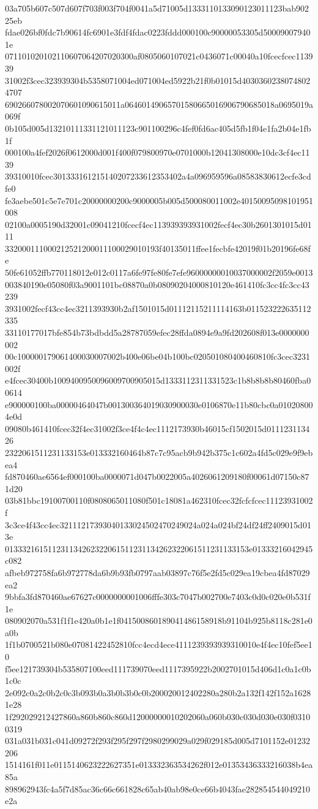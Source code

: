 03a705b607c507d607f703f003f704f0041a5d71005d1333110133090123011123bab90225eb
fdae026bf0fdc7b90614fc6901e3fdf4fdac0223fddd000100c90000053305d500090079401e
071101020102110607064207020300af0805060107021c0436071c00040a10fcecfcec113939
31002f3cec323939304b5358071004ed071004ed5922b21f0b01015d40303602380748024707
690266078002070601090615011a06460149065701580665016906790685018a0695019a069f
0b105d005d13210111331121011123c901100296c4fef0fd6ac405d5fb1f04e1fa2b04e1fb1f
000100a4fef2026f0612000d001f400f079800970e0701000b12041308000e10dc3cf4ec1139
39310010fcec301333161215140207233612353402a4a096959596a08583830612ecfe3cdfe0
fe3aebe501c5e7e701c20000000200c9000005b005d500080011002e40150095098101951008
02100a0005190d32001c09041210fcecf4ec113939393931002fecf4ec30b2601301015d0111
332000111000212521200011100029010193f40135011ffee1fecbfe42019f01b20196fe68fe
50fe61052ffb770118012e012c0117a6fe97fe80fe7efe96000000010037000002f2059e0013
003840190e05080f03a9001101bc08870a0b08090204000810120e461410fc3cc4fc3cc43239
3931002fecf43cc4ec3211393930b2af1501015d01112115211114163b011523222635112335
33110177017bfe854b73bdbdd5a28787059efec28ffda0894e9a9fd202608f013e0000000002
00c100000179061400030007002b400e06be04b100bc020501080400460810fc3cec3231002f
e4fcec30400b1009400950096009700905015d1333112311331523c1b8b8b8b80460fba00614
e900000100ba00000464047b001300364019030900030e0106870e11b80cbc0a010208004e0d
09080b461410fcec32f4ec31002f3ce4f4c4ec1112173930b46015cf1502015d011123113426
2322061511231133153e013332160464b87c7c95acb9b942b375c1c602a4fd5c029e9f9ebea4
fd870460ae6564ef000100ba0000071d047b0022005a4026061209180f00061d07150c871d20
03b81bbc19100700110f0808065011080f501c18081a462310fcec32fcfcfcec11123931002f
3c3ce4f43cc4ec32111217393040133024502470249024a024a024bf24df24ff2409015d013e
013332161511231134262322061511231134262322061511231133153e01333216042945c082
afbeb972758fa6b972778da6b9b93fb0797aab03897c76f5e2fd5c029ea19cbea4fd87029ea2
9bbfa3fd870460ae67627c0000000001006fffe303c7047b002700e7403c0d0c020e0b531f1e
080902070a531f1f1e420a0b1e1f041500860189041486158918b91104b925b8118c281e0a0b
1f1b0700521b080e07081422452810fcc4ecd4ece4111239393939310010e4f4ec10fef5ee10
f5ee121739304b535807100eed111739070eed1117395922b2002701015d406d1c0a1c0b1c0c
2e092c0a2c0b2c0c3b093b0a3b0b3b0c0b200020012402280a280b2a132f142f152a16281e28
1f292029212427860a860b860c860d12000000010202060a060b030c030d030e030f03100319
031a031b031c041d09272f293f295f297f2980299029a029f029185d005d7101152e01232206
1514161f011e0115140623222627351e013332363534262f012e01353436333216038b4ea85a
898962943fc4a5f7d85ac36c66c661828c65ab40ab98e0ce66b4043fae282854544049210e2a
